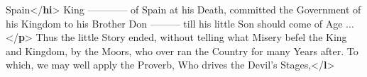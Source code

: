 \begin{shaded}
\hspace*{1em}Spain{</\textbf{hi}>}\mbox{}\newline 
\hspace*{1em}\mbox{}\newline 
\hspace*{1em}King ———— of Spain at his Death, committed the Government of his\mbox{}\newline 
\hspace*{1em}\hspace*{1em}\hspace*{1em}\hspace*{1em} Kingdom to his Brother Don ——— till his little Son should come of\mbox{}\newline 
\hspace*{1em}\hspace*{1em}\hspace*{1em}\hspace*{1em} Age ...{</\textbf{p}>}\mbox{}\newline 
\hspace*{1em}Thus the little Story ended, without telling what Misery\mbox{}\newline 
\hspace*{1em}\hspace*{1em}\hspace*{1em}\hspace*{1em} befel the King and Kingdom, by the Moors, who over ran the Country for\mbox{}\newline 
\hspace*{1em}\hspace*{1em}\hspace*{1em}\hspace*{1em} many Years after. To which, we may well apply the Proverb,\mbox{}\newline 
\hspace*{1em}\mbox{}\newline 
\hspace*{1em}\hspace*{1em}\hspace*{1em}Who drives the Devil's Stages,{</\textbf{l}>}\mbox{}\newline 

\end{shaded}
